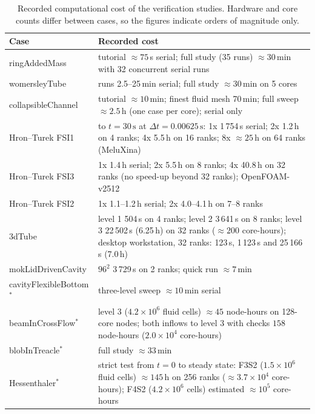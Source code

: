 \begin{table}[htbp]
	\centering
	\footnotesize
	\setlength{\tabcolsep}{3pt}
	\caption{Recorded computational cost of the verification studies. Hardware and core counts differ between cases, so the figures indicate orders of magnitude only.}
	\label{tab:cost}
	\begin{tabular}{p{3.0cm}p{10.8cm}}
		\toprule
		Case & Recorded cost \\
		\midrule
		ringAddedMass & tutorial $\approx75$\,s serial; full study (35 runs) $\approx30$\,min with 32 concurrent serial runs \\
		womersleyTube & runs 2.5--25\,min serial; full study $\approx30$\,min on 5 cores \\
		collapsibleChannel & tutorial $\approx10$\,min; finest fluid mesh 70\,min; full sweep $\approx2.5$\,h (one case per core); serial only \\
		Hron--Turek FSI1 & to $t = 30\,\mathrm{s}$ at $\Delta t = 0.00625\,\mathrm{s}$: 1x 1\,754\,s serial; 2x 1.2\,h on 4 ranks; 4x 5.5\,h on 16 ranks; 8x $\approx25$\,h on 64 ranks (MeluXina) \\
		Hron--Turek FSI3 & 1x 1.4\,h serial; 2x 5.5\,h on 8 ranks; 4x 40.8\,h on 32 ranks (no speed-up beyond 32 ranks); OpenFOAM-v2512 \\
		Hron--Turek FSI2 & 1x 1.1--1.2\,h serial; 2x 4.0--4.1\,h on 7--8 ranks \\
		3dTube & level 1 504\,s on 4 ranks; level 2 3\,641\,s on 8 ranks; level 3 22\,502\,s (6.25\,h) on 32 ranks ($\approx200$ core-hours); desktop workstation, 32 ranks: 123\,s, 1\,123\,s and 25\,166\,s (7.0\,h) \\
		mokLidDrivenCavity & $96^2$ 3\,729\,s on 2 ranks; quick run $\approx7$\,min \\
		cavityFlexibleBottom$^\ast$ & three-level sweep $\approx10$\,min serial \\
		beamInCrossFlow$^\ast$ & level 3 ($4.2\times10^{6}$ fluid cells) $\approx45$ node-hours on 128-core nodes; both inflows to level 3 with checks $158$ node-hours ($2.0\times10^{4}$ core-hours) \\
		blobInTreacle$^\ast$ & full study $\approx33$\,min \\
		Hessenthaler$^\ast$ & strict test from $t=0$ to steady state: F3S2 ($1.5\times10^{6}$ fluid cells) $\approx145$\,h on 256 ranks ($\approx3.7\times10^{4}$ core-hours); F4S2 ($4.2\times10^{6}$ cells) estimated $\approx10^{5}$ core-hours \\
		\bottomrule
	\end{tabular}
\end{table}

